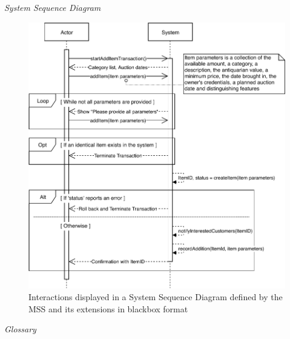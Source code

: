 \newpage
\textsl{System Sequence Diagram}
\begin{figure}[H]
	\centering
	\includegraphics[scale=1]{uml/SD-bb-create.pdf}
	\caption*{Interactions displayed in a System Sequence Diagram defined by the MSS and its extensions in blackbox format}
\end{figure}
\textsl{Glossary}

